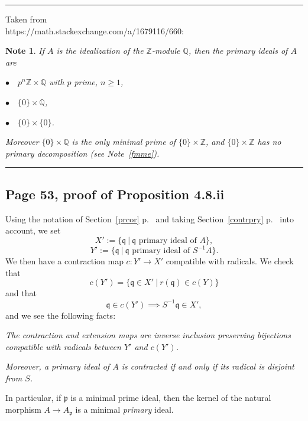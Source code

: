 \documentclass[parskip=half,fontsize=12pt]{scrartcl}%
\newcommand{\mf}{\mathfrak}
\newcommand{\ppp}{\mf p}
\newcommand{\qqq}{\mf q}
\newtheorem{note}[thm]{Note}
\begin{document}
\hrule\bigskip%

Taken from\\ https://math.stackexchange.com/a/1679116/660:\bigskip

\begin{note}%
If $A$ is the idealization of the $\mathbb Z$-module $\mathbb Q$, then the primary ideals of $A$ are  

$\bullet\quad p^n\mathbb Z\times\mathbb Q$ with $p$ prime, $n\ge1$, 

$\bullet\quad\{0\}\times\mathbb Q$,

$\bullet\quad\{0\}\times\{0\}$. 

Moreover $\{0\}\times\mathbb Q$ is the only minimal prime of $\{0\}\times\mathbb Z$, and $\{0\}\times\mathbb Z$ has no primary decomposition (see Note~\ref{fmme}).
\end{note}\bigskip

\hrule\bigskip

\subsection{Page 53, proof of Proposition 4.8.ii}\label{prycor}%

Using the notation of Section~\ref{prcor} p.~\pageref{prcor} and taking Section~\ref{contrpry} p.~\pageref{contrpry} into account, we set 
$$
X':=\{\qqq\ |\ \qqq\text{ primary ideal of }A\},
$$ 
$$
Y':=\{\qqq\ |\ \qqq\text{ primary ideal of }S^{-1}A\}.
$$ 
We then have a contraction map $c:Y'\to X'$ compatible with radicals. We check that  
$$
c(Y')=\{\qqq\in X'\ |\ r(\qqq)\in c(Y)\}
$$ 
and that 
$$
\qqq\in c(Y')\implies S^{-1}\qqq\in X',
$$ 
and we see the following facts: 

\emph{The contraction and extension maps are inverse inclusion preserving bijections compatible with radicals between $Y'$ and $c(Y')$.} 

\emph{Moreover, a primary ideal of $A$ is contracted if and only if its radical is disjoint from $S$.}

In particular, if $\ppp$ is a minimal prime ideal, then the kernel of the natural morphism $A\to A_\ppp$ is a minimal \emph{primary} ideal.

\begin{comment}
We have 
$$
\mf q^{\text{ec}}=\bigcup_{s\in S}\ (\mf q:s)=\mf q
$$ 
by Proposition 3.11ii p.~41 and Lemma 4.4iii p.~51, and 
$$
r(\mf q^{\text e})=r(S^{-1}\mf q)=S^{-1}r(\mf q)=S^{-1}\ppp
$$ 
by Proposition 3.11v p.~42.
\end{comment}
\end{document}

